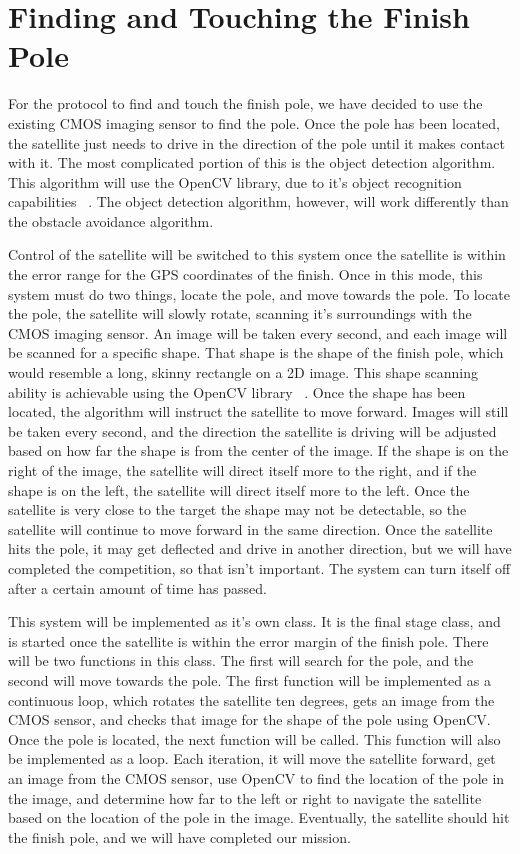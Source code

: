 \documentclass[10pt,letterpaper,onecolumn,journal]{IEEEtran}
\begin{document}
\section{Finding and Touching the Finish Pole}
For the protocol to find and touch the finish pole, we have decided to use the existing CMOS imaging sensor to find the pole. Once the pole has been located, the satellite just needs to drive in the direction of the pole until it makes contact with it. The most complicated portion of this is the object detection algorithm. This algorithm will use the OpenCV library, due to it’s object recognition capabilities ~\cite{agam2006}. The object detection algorithm, however, will work differently than the obstacle avoidance algorithm.\vspace{.3cm}
\par
Control of the satellite will be switched to this system once the satellite is within the error range for the GPS coordinates of the finish. Once in this mode, this system must do two things, locate the pole, and move towards the pole. To locate the pole, the satellite will slowly rotate, scanning it’s surroundings with the CMOS imaging sensor. An image will be taken every second, and each image will be scanned for a specific shape. That shape is the shape of the finish pole, which would resemble a long, skinny rectangle on a 2D image. This shape scanning ability is achievable using the OpenCV library ~\cite{rosebrock}. Once the shape has been located, the algorithm will instruct the satellite to move forward. Images will still be taken every second, and the direction the satellite is driving will be adjusted based on how far the shape is from the center of the image. If the shape is on the right of the image, the satellite will direct itself more to the right, and if the shape is on the left, the satellite will direct itself more to the left. Once the satellite is very close to the target the shape may not be detectable, so the satellite will continue to move forward in the same direction. Once the satellite hits the pole, it may get deflected and drive in another direction, but we will have completed the competition, so that isn’t important. The system can turn itself off after a certain amount of time has passed.\vspace{.3cm}
\par
This system will be implemented as it’s own class. It is the final stage class, and is started once the satellite is within the error margin of the finish pole. There will be two functions in this class. The first will search for the pole, and the second will move towards the pole. The first function will be implemented as a continuous loop, which rotates the satellite ten degrees, gets an image from the CMOS sensor, and checks that image for the shape of the pole using OpenCV. Once the pole is located, the next function will be called. This function will also be implemented as a loop. Each iteration, it will move the satellite forward, get an image from the CMOS sensor, use OpenCV to find the location of the pole in the image, and determine how far to the left or right to navigate the satellite based on the location of the pole in the image. Eventually, the satellite should hit the finish pole, and we will have completed our mission.\vspace{.3cm}
\end{document}
